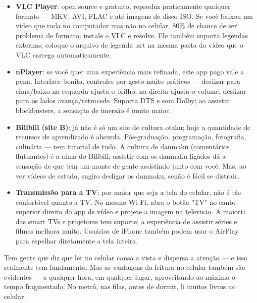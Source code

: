 \begin{itemize}
  \item \textbf{VLC Player}: open source e gratuito, reproduz praticamente qualquer formato — MKV, AVI, FLAC e até imagens de disco ISO. Se você baixou um vídeo que roda no computador mas não no celular, 80\% de chance de ser problema de formato; instale o VLC e resolve. Ele também suporta legendas externas; coloque o arquivo de legenda .srt na mesma pasta do vídeo que o VLC carrega automaticamente.
  \item \textbf{nPlayer}: se você quer uma experiência mais refinada, este app pago vale a pena. Interface bonita, controles por gesto muito práticos — deslizar para cima/baixo na esquerda ajusta o brilho, na direita ajusta o volume, deslizar para os lados avança/retrocede. Suporta DTS e som Dolby; ao assistir blockbusters, a sensação de imersão é muito maior.
  \item \textbf{Bilibili (site B)}: já não é só um site de cultura otaku; hoje a quantidade de recursos de aprendizado é absurda. Pós-graduação, programação, fotografia, culinária — tem tutorial de tudo. A cultura de danmaku (comentários flutuantes) é a alma do Bilibili; assistir com os danmaku ligados dá a sensação de que tem um monte de gente assistindo junto com você. Mas, ao ver vídeos de estudo, sugiro desligar os danmaku, senão é fácil se distrair.
  \item \textbf{Transmissão para a TV}: por maior que seja a tela do celular, não é tão confortável quanto a TV. No mesmo Wi-Fi, abra o botão "TV" no canto superior direito do app de vídeo e projete a imagem na televisão. A maioria das smart TVs e projetores tem suporte; a experiência de assistir séries e filmes melhora muito. Usuários de iPhone também podem usar o AirPlay para espelhar diretamente a tela inteira.
\end{itemize}


Tem gente que diz que ler no celular cansa a vista e dispersa a atenção — e isso realmente tem fundamento. Mas as vantagens da leitura no celular também são evidentes — a qualquer hora, em qualquer lugar, aproveitando ao máximo o tempo fragmentado. No metrô, nas filas, antes de dormir, li muitos livros no celular.

